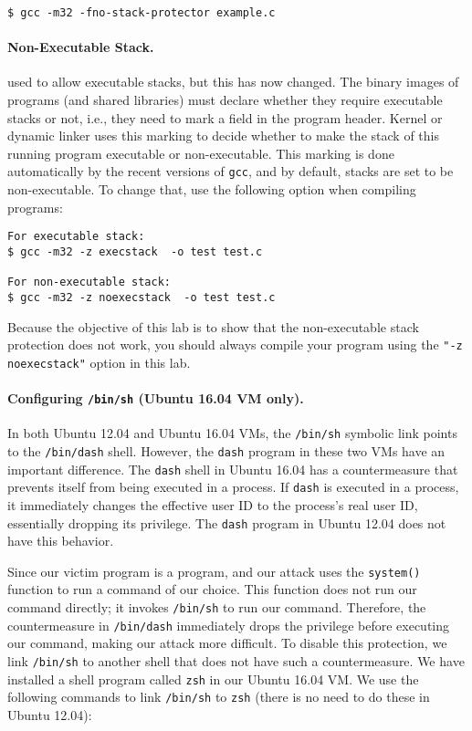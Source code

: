 \begin{lstlisting}
$ gcc -m32 -fno-stack-protector example.c
\end{lstlisting}


\paragraph{Non-Executable Stack.} \ubuntu used to allow executable stacks,
but this has now changed. The binary images of programs (and shared
libraries) must declare whether they require executable stacks or not,
i.e., they need to mark a field in the program header. Kernel or dynamic
linker uses this marking to decide whether to make the stack of this
running program executable or non-executable. This marking is done
automatically by the recent versions of {\tt gcc}, and by default, 
stacks are set to be non-executable.  
To change that, use the following option when compiling programs:


\begin{lstlisting}
For executable stack:
$ gcc -m32 -z execstack  -o test test.c

For non-executable stack:
$ gcc -m32 -z noexecstack  -o test test.c
\end{lstlisting}



Because the objective of this lab is to show that the non-executable stack
protection does not work, you should always compile your program using the 
{\tt "-z noexecstack"} option in this lab.


\paragraph{Configuring \texttt{/bin/sh} (Ubuntu 16.04 VM only).} In both Ubuntu 12.04 and
Ubuntu 16.04 VMs, the \texttt{/bin/sh} symbolic link points to
the \texttt{/bin/dash} shell. However, the \texttt{dash} program
in these two VMs have an important difference.
The \texttt{dash} shell in Ubuntu 16.04 has a countermeasure
that prevents itself from being executed in a \setuid process.
If \texttt{dash} is 
executed in a \setuid process, it immediately
changes the effective user ID to the process's real user ID, essentially
dropping its privilege. The \texttt{dash} program in Ubuntu 12.04 does not have this
behavior.

Since our victim program is a \setuid program, and our
attack uses the \texttt{system()} function to run a command of our
choice. This function does not run our command directly; it 
invokes \texttt{/bin/sh} to run our command. Therefore, 
the countermeasure in \texttt{/bin/dash} immediately drops
the \setuid privilege before executing our command, making our 
attack more difficult. To disable this protection, 
we link \texttt{/bin/sh} to another shell that does not
have such a countermeasure.
We have installed a shell program
called \texttt{zsh} in our Ubuntu 16.04 VM. We use the following
commands to link \texttt{/bin/sh} to \texttt{zsh} (there is no need to do
these in Ubuntu 12.04):



